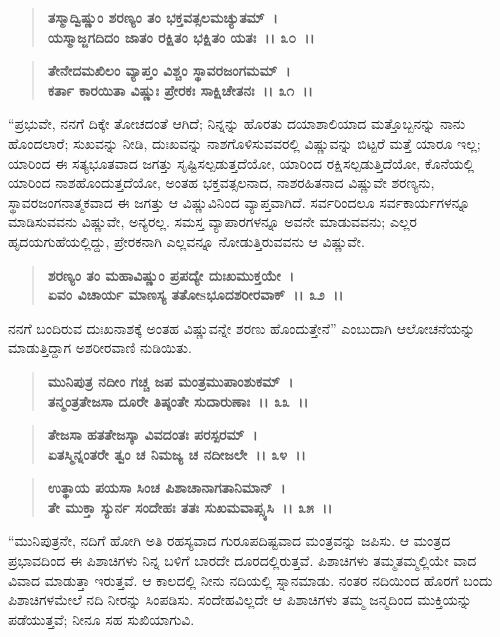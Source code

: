 \begin{verse}
\textbf{ತಸ್ಮಾದ್ವಿಷ್ಣುಂ ಶರಣ್ಯಂ ತಂ ಭಕ್ತವತ್ಸಲಮಚ್ಯುತಮ್~।}\\\textbf{ಯಸ್ಮಾಜ್ಜಗದಿದಂ ಜಾತಂ ರಕ್ಷಿತಂ ಭಕ್ಷಿತಂ ಯತಃ~।। ೩೦~।।} 
\end{verse}

\begin{verse}
\textbf{ತೇನೇದಮಖಿಲಂ ವ್ಯಾಪ್ತಂ ವಿಶ್ಚಂ ಸ್ಥಾವರಜಂಗಮಮ್~।}\\\textbf{ಕರ್ತಾ ಕಾರಯಿತಾ ವಿಷ್ಣುಃ ಪ್ರೇರಕಃ ಸಾಕ್ಷಿಚೇತನಃ~।। ೩೧~।।}
\end{verse}

“ಪ್ರಭುವೇ, ನನಗೆ ದಿಕ್ಕೇ ತೋಚದಂತೆ ಆಗಿದೆ; ನಿನ್ನನ್ನು ಹೊರತು ದಯಾಶಾಲಿಯಾದ ಮತ್ತೊಬ್ಬನನ್ನು ನಾನು ಹೊಂದಲಾರೆ; ಸುಖವನ್ನು ನೀಡಿ, ದುಃಖವನ್ನು ನಾಶಗೊಳಿಸುವವರಲ್ಲಿ ವಿಷ್ಣುವನ್ನು ಬಿಟ್ಟರೆ ಮತ್ತೆ ಯಾರೂ ಇಲ್ಲ; ಯಾರಿಂದ ಈ ಸತ್ಯಭೂತವಾದ ಜಗತ್ತು ಸೃಷ್ಟಿಸಲ್ಪಡುತ್ತದೆಯೋ, ಯಾರಿಂದ ರಕ್ಷಿಸಲ್ಪಡುತ್ತಿದೆಯೋ, ಕೊನೆಯಲ್ಲಿ ಯಾರಿಂದ ನಾಶಹೊಂದುತ್ತದೆಯೋ, ಅಂತಹ ಭಕ್ತವತ್ಸಲನಾದ, ನಾಶರಹಿತನಾದ ವಿಷ್ಣುವೇ ಶರಣ್ಯನು, ಸ್ಥಾವರಜಂಗನಾತ್ಮಕವಾದ ಈ ಜಗತ್ತು ಆ ವಿಷ್ಣುವಿನಿಂದ ವ್ಯಾಪ್ತವಾಗಿದೆ. ಸರ್ವರಿಂದಲೂ ಸರ್ವಕಾರ್ಯಗಳನ್ನೂ ಮಾಡಿಸುವವನು ವಿಷ್ಣುವೇ, ಅನ್ಯರಲ್ಲ. ಸಮಸ್ತ ವ್ಯಾಪಾರಗಳನ್ನೂ ಅವನೇ ಮಾಡುವವನು; ಎಲ್ಲರ ಹೃದಯಗುಹೆಯಲ್ಲಿದ್ದು, ಪ್ರೇರಕನಾಗಿ ಎಲ್ಲವನ್ನೂ ನೋಡುತ್ತಿರುವವನು ಆ ವಿಷ್ಣುವೇ.

\begin{verse}
\textbf{ಶರಣ್ಯಂ ತಂ ಮಹಾವಿಷ್ಣುಂ ಪ್ರಪದ್ಯೇ ದುಃಖಮುಕ್ತಯೇ~।}\\\textbf{ಏವಂ ವಿಚಾರ್ಯ ಮಾಣಸ್ಯ ತತೋsಭೂದಶರೀರವಾಕ್~।। ೩೨~।।}
\end{verse}

ನನಗೆ ಬಂದಿರುವ ದುಃಖನಾಶಕ್ಕೆ ಅಂತಹ ವಿಷ್ಣುವನ್ನೇ ಶರಣು ಹೊಂದುತ್ತೇನೆ'' ಎಂಬುದಾಗಿ ಆಲೋಚನೆಯನ್ನು ಮಾಡುತ್ತಿದ್ದಾಗ ಅಶರೀರವಾಣಿ ನುಡಿಯಿತು.

\begin{verse}
\textbf{ಮುನಿಪುತ್ರ ನದೀಂ ಗಚ್ಚ ಜಪ ಮಂತ್ರಮುಪಾಂಶುಕಮ್~।}\\\textbf{ತನ್ಮಂತ್ರತೇಜಸಾ ದೂರೇ ತಿಷ್ಠಂತೇ ಸುದಾರುಣಾಃ~।। ೩೩~।। }
\end{verse}

\begin{verse}
\textbf{ತೇಜಸಾ ಹತತೇಜಸ್ಕಾ ವಿವದಂತಃ ಪರಸ್ಪರಮ್~।}\\\textbf{ಏತಸ್ಮಿನ್ನಂತರೇ ತ್ವಂ ಚ ನಿಮಜ್ಯ ಚ ನದೀಜಲೇ~।। ೩೪~।।} 
\end{verse}

\begin{verse}
\textbf{ಉತ್ಥಾಯ ಪಯಸಾ ಸಿಂಚ ಪಿಶಾಚಾನಾಗತಾನಿಮಾನ್~।}\\\textbf{ತೇ ಮುಕ್ತಾ ಸ್ಯುರ್ನ ಸಂದೇಹಃ ತತಃ ಸುಖಮವಾಪ್ಸ್ಯಸಿ~।। ೩೫~।।}
\end{verse}

“ಮುನಿಪುತ್ರನೇ, ನದಿಗೆ ಹೋಗಿ ಅತಿ ರಹಸ್ಯವಾದ ಗುರೂಪದಿಷ್ಟವಾದ ಮಂತ್ರವನ್ನು ಜಪಿಸು. ಆ ಮಂತ್ರದ ಪ್ರಭಾವದಿಂದ ಈ ಪಿಶಾಚಿಗಳು ನಿನ್ನ ಬಳಿಗೆ ಬಾರದೇ ದೂರದಲ್ಲಿರುತ್ತವೆ. ಪಿಶಾಚಿಗಳು ತಮ್ಮತಮ್ಮಲ್ಲಿಯೇ ವಾದ ವಿವಾದ ಮಾಡುತ್ತಾ ಇರುತ್ತವೆ. ಆ ಕಾಲದಲ್ಲಿ ನೀನು ನದಿಯಲ್ಲಿ ಸ್ನಾನಮಾಡು. ನಂತರ ನದಿಯಿಂದ ಹೊರಗೆ ಬಂದು ಪಿಶಾಚಿಗಳಮೇಲೆ ನದಿ ನೀರನ್ನು ಸಿಂಪಡಿಸು. ಸಂದೇಹವಿಲ್ಲದೇ ಆ ಪಿಶಾಚಿಗಳು ತಮ್ಮ ಜನ್ಮದಿಂದ ಮುಕ್ತಿಯನ್ನು ಪಡೆಯುತ್ತವೆ; ನೀನೂ ಸಹ ಸುಖಿಯಾಗುವಿ.


